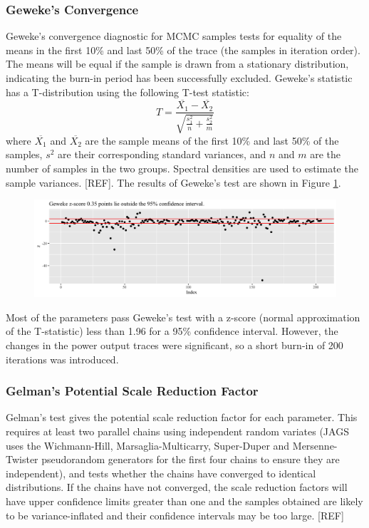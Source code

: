 \documentclass[a4paper, 12pt]{article}
\begin{document}
\subsubsection{Geweke's Convergence}
Geweke's convergence diagnostic for MCMC samples tests for equality of the means in the first 10\% and last 50\% of the trace (the samples in iteration order). The means will be equal if the sample is drawn from a stationary distribution, indicating the burn-in period has been successfully excluded. Geweke's statistic has a T-distribution using the following T-test statistic:
\begin{equation}
T=\frac{\overline{X_1}-\overline{X_2}}{\sqrt{\frac{s_1^2}{n} + \frac{s_2^2}{m}}}
\end{equation}
where $\overline{X_1}$ and $\overline{X_2}$ are the sample means of the first 10\% and last 50\% of the samples, $s^2$ are their corresponding standard variances, and $n$ and $m$ are the number of samples in the two groups. Spectral densities are used to estimate the sample variances. [REF]. The results of Geweke's test are shown in Figure \ref{fig:geweke}.

\begin{figure}
  \centering
  \includegraphics[width=\linewidth]{media/geweke}
  \label{fig:geweke}
\end{figure}

Most of the parameters pass Geweke's test with a z-score (normal approximation of the T-statistic) less than 1.96 for a 95\% confidence interval. However, the changes in the power output traces were significant, so a short burn-in of 200 iterations was introduced.

\subsubsection{Gelman's Potential Scale Reduction Factor}
Gelman's test gives the potential scale reduction factor for each parameter. This requires at least two parallel chains using independent random variates (JAGS uses the Wichmann-Hill, Marsaglia-Multicarry, Super-Duper and Mersenne-Twister pseudorandom generators for the first four chains to ensure they are independent), and tests whether the chains have converged to identical distributions. If the chains have not converged, the scale reduction factors will have upper confidence limits greater than one and the samples obtained are likely to be variance-inflated and their confidence intervals may be too large. [REF]
\end{document}
